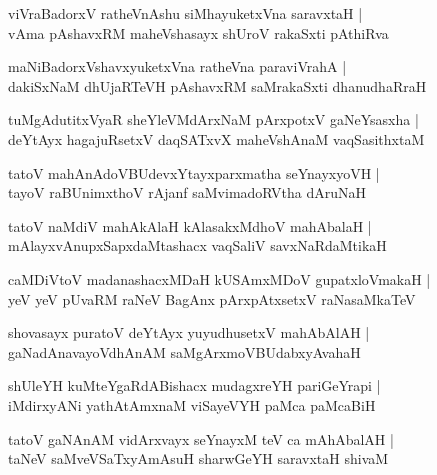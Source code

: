 \documentclass[twoside,12pt,openright]{book}
\newcounter{shloka}[chapter]
\begin{document}
\begin{shloka}%
viVraBadorxV ratheVnAshu siMhayuketxVna saravxtaH |\\
vAma pAshavxRM maheVshasayx shUroV rakaSxti pAthiRva 
\end{shloka}

\begin{shloka}%
maNiBadorxVshavxyuketxVna ratheVna paraviVrahA |\\
dakiSxNaM dhUjaRTeVH pAshavxRM saMrakaSxti dhanudhaRraH 
\end{shloka}

\begin{shloka}%
tuMgAdutitxVyaR sheYleVMdArxNaM pArxpotxV gaNeYsasxha |\\
deYtAyx hagajuRsetxV daqSATxvX maheVshAnaM vaqSasithxtaM 
\end{shloka}

\begin{shloka}%
tatoV mahAnAdoVBUdevxYtayxparxmatha seYnayxyoVH |\\
tayoV raBUnimxthoV rAjanf saMvimadoRVtha dAruNaH
\end{shloka}

\begin{shloka}%
tatoV naMdiV mahAkAlaH kAlasakxMdhoV mahAbalaH |\\
mAlayxvAnupxSapxdaMtashacx vaqSaliV savxNaRdaMtikaH 
\end{shloka}

\begin{shloka}%
caMDiVtoV madanashacxMDaH kUSAmxMDoV gupatxloVmakaH |\\
yeV yeV pUvaRM raNeV BagAnx pArxpAtxsetxV raNasaMkaTeV 
\end{shloka}

\begin{shloka}%
shovasayx puratoV deYtAyx yuyudhusetxV mahAbAlAH |\\
gaNadAnavayoVdhAnAM saMgArxmoVBUdabxyAvahaH 
\end{shloka}

\begin{shloka}%
shUleYH kuMteYgaRdABishacx mudagxreYH pariGeYrapi |\\
iMdirxyANi yathAtAmxnaM viSayeVYH paMca paMcaBiH 
\end{shloka}

\begin{shloka}%
tatoV gaNAnAM vidArxvayx seYnayxM teV ca mAhAbalAH |\\
taNeV saMveVSaTxyAmAsuH sharwGeYH saravxtaH shivaM 
\end{shloka}
\end{document}
